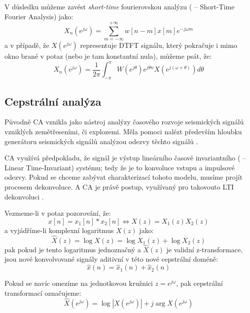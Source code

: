 V důsledku můžeme zavést {\sl short-time} fourierovskou analýzu ( -- Short-Time Fourier Analysis) jako:
%
\begin{equation}
	\label{eq:stfa}
	X_n(e^{j\omega}) = \sum\limits_{m=-\infty}^{+\infty} w[n-m]x[m]e^{-j\omega m}
\end{equation}
%
a v případě, že $X(e^{j\omega})$ representuje DTFT signálu, který pokračuje i mimo okno brané v potaz (nebo je tam konstantní nula), můžeme psát, že:
%
\begin{equation}
	\label{eq:stfa_f}
	X_n(e^{j\omega}) = \frac{1}{2\pi} \int_{-\pi}^{\pi} W(e^{j\theta})e^{j\theta n}X(e^{j(\omega + \theta)})d\theta
\end{equation}

\subsection{Cepstrální analýza}

Původně CA vznikla jako nástroj analýzy časového rozvoje seismických signálů vzniklých zemětřeseními, či explozemi. Měla pomoci nalézt především hloubku generátoru seismických signálů analýzou odezvy těchto signálů \cite{bogert_1963}.

CA využívá předpokladu, že signál je výstup lineárního časově invariantního ( -- Linear Time-Invariant) systému; tedy že je to konvoluce vstupu a impulsové odezvy. Pokud se chceme zabývat charakterizací tohoto modelu, musíme projít procesem dekonvoluce. A CA je právě postup, využívaný pro takovouto LTI dekonvoluci \cite{tohkura_1987}.

Vezmeme-li v potaz pozorování, že:
%
\begin{equation}
	\label{eq:ca_obs}
	x[n] = x_1[n] * x_2[n] \iff X(z) = X_1(z) X_2(z)
\end{equation}
%
a vyjádříme-li komplexní logaritmus $X(z)$ jako:
%
\begin{equation}
	\label{eq:ca_l}
	\widehat{X}(z) = \log X(z) = \log X_1(z) + \log X_2(z)
\end{equation}
%
pak pokud je tento logaritmus jednoznačný a $\widehat{X}(z)$ je validní z-transformace, jsou nové konvolvované signály aditivní v této nové cepstrální doméně:
%
\begin{equation}
	\label{eq:ca_xl}
	\widehat{x}(n) = \widehat{x}_1(n) + \widehat{x}_2(n)
\end{equation}

Pokud se navíc omezíme na jednotkovou kružnici $z = e^{j\omega}$, pak cepstrální transformací označujeme:
%
\begin{equation}
	\label{eq:ca_f}
	\widehat{X}(e^{j\omega}) = \log |X(e^{j\omega})| + j \arg X(e^{j\omega})
\end{equation}

